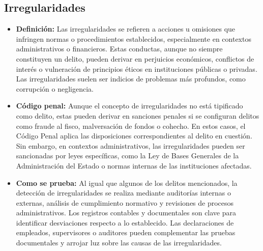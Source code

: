\documentclass[letter,12pt]{article}
\begin{document}
	\subsection{Irregularidades}
	\begin{itemize}
		\item \textbf{Definición: }Las irregularidades se refieren a acciones u omisiones que infringen normas o procedimientos establecidos, especialmente en contextos administrativos o financieros. Estas conductas, aunque no siempre constituyen un delito, pueden derivar en perjuicios económicos, conflictos de interés o vulneración de principios éticos en instituciones públicas o privadas. Las irregularidades suelen ser indicios de problemas más profundos, como corrupción o negligencia.\\
		
		\item \textbf{Código penal: }Aunque el concepto de irregularidades no está tipificado como delito, estas pueden derivar en sanciones penales si se configuran delitos como fraude al fisco, malversación de fondos o cohecho. En estos casos, el Código Penal aplica las disposiciones correspondientes al delito en cuestión. Sin embargo, en contextos administrativos, las irregularidades pueden ser sancionadas por leyes específicas, como la Ley de Bases Generales de la Administración del Estado o normas internas de las instituciones afectadas.\\
		
		\item \textbf{Como se prueba: }Al igual que algunos de los delitos mencionados, la detección de irregularidades se realiza mediante auditorías internas o externas, análisis de cumplimiento normativo y revisiones de procesos administrativos. Los registros contables y documentales son clave para identificar desviaciones respecto a lo establecido. Las declaraciones de empleados, supervisores o auditores pueden complementar las pruebas documentales y arrojar luz sobre las causas de las irregularidades.\\
		

\end{itemize}
\end{document}
